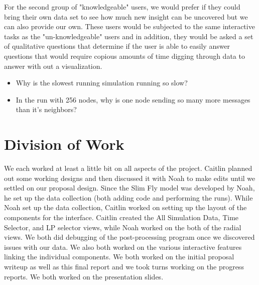 \documentclass{acm_proc_article-sp}
\begin{document}
For the second group of "knowledgeable" users, we would prefer if they could bring their own data set to see how much new insight can be uncovered but we can also provide our own. These users would be subjected to the same interactive tasks as the "un-knowledgeable" users and in addition, they would be asked a set of qualitative questions that determine if the user is able to easily answer questions that would require copious amounts of time digging through data to answer with out a visualization.
\begin{itemize}
\item Why is the slowest running simulation running so slow?
\item In the run with 256 nodes, why is one node sending so many more messages than it's neighbors?
\end{itemize}

\section{Division of Work}
We each worked at least a little bit on all aspects of the project.  Caitlin planned out some working designs and then discussed it with Noah to make edits until we settled on our proposal design.  Since the Slim Fly model was developed by Noah, he set up the data collection (both adding code and performing the runs).  While Noah set up the data collection, Caitlin worked on setting up the layout of the components for the interface.  Caitlin created the All Simulation Data, Time Selector, and LP selector views, while Noah worked on the both of the radial views.  We both did debugging of the post-processing program once we discovered issues with our data.  We also both worked on the various interactive features linking the individual components.  We both worked on the initial proposal writeup as well as this final report and we took turns working on the progress reports.  We both worked on the presentation slides.  





%

%
%


\end{document}
